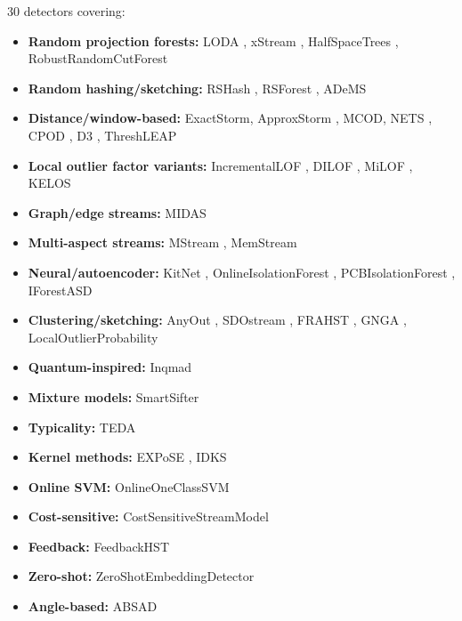 \documentclass[11pt,a4paper]{article}
\begin{document}
30 detectors covering:
\begin{itemize}
    \item \textbf{Random projection forests:} LODA \citep{pevny2016loda}, xStream \citep{xstream}, HalfSpaceTrees \citep{tan2011half}, RobustRandomCutForest \citep{guha2016robust}
    \item \textbf{Random hashing/sketching:} RSHash \citep{sathe2016subspace}, RSForest \citep{wu2014rsforest}, ADeMS \citep{huang2015streaming}
    \item \textbf{Distance/window-based:} ExactStorm, ApproxStorm \citep{angiulli2007detecting}, MCOD, NETS \citep{yoon2019nets}, CPOD \citep{tran2020cpod}, D3 \citep{subramaniam2006online}, ThreshLEAP \citep{cao2014scalable}
    \item \textbf{Local outlier factor variants:} IncrementalLOF \citep{pokrajac2007incremental}, DILOF \citep{na2018dilof}, MiLOF \citep{salehi2016fast}, KELOS \citep{qin2019scalable}
    \item \textbf{Graph/edge streams:} MIDAS \citep{bhatia2020midas}
    \item \textbf{Multi-aspect streams:} MStream \citep{bhatia2021mstream}, MemStream \citep{bhatia2022memstream}
    \item \textbf{Neural/autoencoder:} KitNet \citep{mirsky2018kitsune}, OnlineIsolationForest \citep{leveni2024online}, PCBIsolationForest \citep{heigl2021improvement}, IForestASD \citep{ding2013anomaly}
    \item \textbf{Clustering/sketching:} AnyOut \citep{assent2012anyout}, SDOstream \citep{hartl2020low}, FRAHST \citep{teixeira2010data}, GNGA \citep{bouguelia2018adaptive}, LocalOutlierProbability \citep{kriegel2009loop}
    \item \textbf{Quantum-inspired:} Inqmad \citep{gallego2022inqmad}
    \item \textbf{Mixture models:} SmartSifter \citep{yamanishi2000smartsifter}
    \item \textbf{Typicality:} TEDA \citep{angelov2014typicality}
    \item \textbf{Kernel methods:} EXPoSE \citep{schneider2016expose}, IDKS \citep{xu2026idks}
    \item \textbf{Online SVM:} OnlineOneClassSVM \citep{kivinen2004online}
    \item \textbf{Cost-sensitive:} CostSensitiveStreamModel \citep{wang2013cost}
    \item \textbf{Feedback:} FeedbackHST \citep{tan2011half,das2024feedback}
    \item \textbf{Zero-shot:} ZeroShotEmbeddingDetector \citep{ming2022zero}
    \item \textbf{Angle-based:} ABSAD \citep{zhang2017absad}
\end{itemize}
\end{document}
